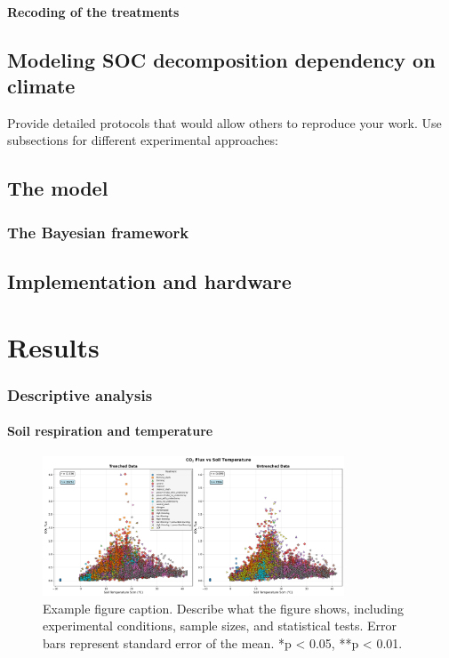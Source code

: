 \documentclass[12pt,a4paper]{article}
\begin{document}
\paragraph{Recoding of the treatments}


\subsection{Modeling SOC decomposition dependency on climate}

Provide detailed protocols that would allow others to reproduce your work. Use subsections for different experimental approaches:




\subsection{The model}

\subsubsection{The Bayesian framework}

\subsection{Implementation and hardware}




\section{Results}

\subsubsection{Descriptive analysis}

\paragraph{Soil respiration and temperature}
\begin{figure}[H]
    \centering
    \includegraphics[width=0.8\textwidth]{"../co2_flux_temperature_comparison.png"}
    \caption{Example figure caption. Describe what the figure shows, including experimental conditions, sample sizes, and statistical tests. Error bars represent standard error of the mean. *p < 0.05, **p < 0.01.}
    \label{fig:example}
\end{figure}
\end{document}
